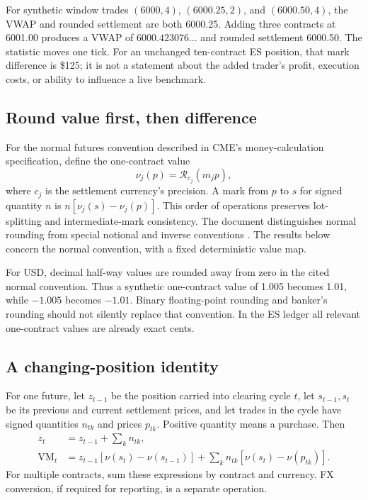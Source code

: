 For synthetic window trades $(6000,4)$, $(6000.25,2)$, and $(6000.50,4)$, the VWAP and rounded settlement are both 6000.25. Adding three contracts at 6001.00 produces a VWAP of $6000.423076\ldots$ and rounded settlement 6000.50. The statistic moves one tick. For an unchanged ten-contract ES position, that mark difference is \$125; it is not a statement about the added trader's profit, execution costs, or ability to influence a live benchmark.

\subsection{Round value first, then difference}

For the normal futures convention described in CME's money-calculation specification, define the one-contract value
\begin{equation}
 \nu_j(p)=\mathcal R_{c_j}(m_jp),
\label{eq:moneyvalue}
\end{equation}
where $c_j$ is the settlement currency's precision. A mark from $p$ to $s$ for signed quantity $n$ is $n[\nu_j(s)-\nu_j(p)]$. This order of operations preserves lot-splitting and intermediate-mark consistency. The document distinguishes normal rounding from special notional and inverse conventions \citep{CMEMoney}. The results below concern the normal convention, with a fixed deterministic value map.

For USD, decimal half-way values are rounded away from zero in the cited normal convention. Thus a synthetic one-contract value of 1.005 becomes 1.01, while $-1.005$ becomes $-1.01$. Binary floating-point rounding and banker's rounding should not silently replace that convention. In the ES ledger all relevant one-contract values are already exact cents.

\subsection{A changing-position identity}

For one future, let $z_{t-1}$ be the position carried into clearing cycle $t$, let $s_{t-1},s_t$ be its previous and current settlement prices, and let trades in the cycle have signed quantities $n_{tk}$ and prices $p_{tk}$. Positive quantity means a purchase. Then
\begin{align}
 z_t&=z_{t-1}+\sum_kn_{tk},\\
 \mathrm{VM}_t&=z_{t-1}[\nu(s_t)-\nu(s_{t-1})]
       +\sum_kn_{tk}[\nu(s_t)-\nu(p_{tk})].
\label{eq:vm}
\end{align}
For multiple contracts, sum these expressions by contract and currency. FX conversion, if required for reporting, is a separate operation.

